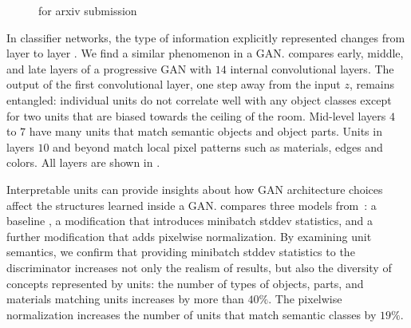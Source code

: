 \documentclass{article} %
\def\arxiv{for arxiv submission}
\begin{document}
\begin{figure}[t]
\ifdefined\arxiv
\else
\vspace{-5pt}
\fi
\end{figure}
In classifier networks, the type of information explicitly represented changes from layer to layer \citep{zeiler2014visualizing}. We find a similar phenomenon in a GAN.   compares early, middle, and late layers of a progressive GAN with $14$ internal convolutional layers.  The output of the first convolutional layer, one step away from the input $z$, remains entangled: individual units do not correlate well with any object classes except for two units that are biased towards the ceiling of the room.  Mid-level layers $4$ to $7$ have many units that match semantic objects and object parts.  Units in layers $10$ and beyond match local pixel patterns such as materials, edges and colors. All layers are shown in .

Interpretable units can provide insights about how GAN architecture choices affect the structures learned inside a GAN.  compares three models from~\citet{karras2018progressive}: a baseline \pgan, a modification that introduces minibatch stddev statistics, and a further modification that adds pixelwise normalization. By examining unit semantics, we confirm that providing minibatch stddev statistics to the discriminator increases not only the realism of results, but also the diversity of concepts represented by units: the number of types of objects, parts, and materials matching units increases by more than $40\%$. The pixelwise normalization increases the number of units that match semantic classes by $19\%$.
\end{document}
